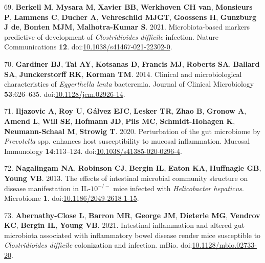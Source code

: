 \documentclass[
  12pt,
]{article}
\newenvironment{cslreferences}%
  {}%
  {\par}
\begin{document}
\begin{cslreferences}
\leavevmode\hypertarget{ref-Berkell2021}{}%
69. \textbf{Berkell M}, \textbf{Mysara M}, \textbf{Xavier BB},
\textbf{Werkhoven CH van}, \textbf{Monsieurs P}, \textbf{Lammens C},
\textbf{Ducher A}, \textbf{Vehreschild MJGT}, \textbf{Goossens H},
\textbf{Gunzburg J de}, \textbf{Bonten MJM}, \textbf{Malhotra-Kumar S}.
2021. Microbiota-based markers predictive of development of
\emph{Clostridioides difficile} infection. Nature Communications
\textbf{12}.
doi:\href{https://doi.org/10.1038/s41467-021-22302-0}{10.1038/s41467-021-22302-0}.

\leavevmode\hypertarget{ref-Gardiner2014}{}%
70. \textbf{Gardiner BJ}, \textbf{Tai AY}, \textbf{Kotsanas D},
\textbf{Francis MJ}, \textbf{Roberts SA}, \textbf{Ballard SA},
\textbf{Junckerstorff RK}, \textbf{Korman TM}. 2014. Clinical and
microbiological characteristics of \emph{Eggerthella lenta} bacteremia.
Journal of Clinical Microbiology \textbf{53}:626--635.
doi:\href{https://doi.org/10.1128/jcm.02926-14}{10.1128/jcm.02926-14}.

\leavevmode\hypertarget{ref-Iljazovic2020}{}%
71. \textbf{Iljazovic A}, \textbf{Roy U}, \textbf{Gálvez EJC},
\textbf{Lesker TR}, \textbf{Zhao B}, \textbf{Gronow A}, \textbf{Amend
L}, \textbf{Will SE}, \textbf{Hofmann JD}, \textbf{Pils MC},
\textbf{Schmidt-Hohagen K}, \textbf{Neumann-Schaal M}, \textbf{Strowig
T}. 2020. Perturbation of the gut microbiome by \emph{Prevotella} spp.
enhances host susceptibility to mucosal inflammation. Mucosal Immunology
\textbf{14}:113--124.
doi:\href{https://doi.org/10.1038/s41385-020-0296-4}{10.1038/s41385-020-0296-4}.

\leavevmode\hypertarget{ref-Nagalingam2013}{}%
72. \textbf{Nagalingam NA}, \textbf{Robinson CJ}, \textbf{Bergin IL},
\textbf{Eaton KA}, \textbf{Huffnagle GB}, \textbf{Young VB}. 2013. The
effects of intestinal microbial community structure on disease
manifestation in IL-\(10^{-/-}\) mice infected with \emph{Helicobacter
hepaticus}. Microbiome \textbf{1}.
doi:\href{https://doi.org/10.1186/2049-2618-1-15}{10.1186/2049-2618-1-15}.

\leavevmode\hypertarget{ref-AbernathyClose2021}{}%
73. \textbf{Abernathy-Close L}, \textbf{Barron MR}, \textbf{George JM},
\textbf{Dieterle MG}, \textbf{Vendrov KC}, \textbf{Bergin IL},
\textbf{Young VB}. 2021. Intestinal inflammation and altered gut
microbiota associated with inflammatory bowel disease render mice
susceptible to \emph{Clostridioides difficile} colonization and
infection. mBio.
doi:\href{https://doi.org/10.1128/mbio.02733-20}{10.1128/mbio.02733-20}.


\end{cslreferences}
\end{document}
